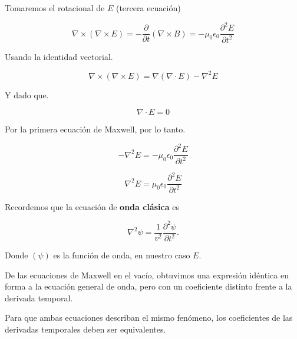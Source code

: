 \documentclass[a4paper,12pt]{article} %
\begin{document}
\begin{justify}
    Tomaremos el rotacional de \(E\) (tercera ecuación) 
\end{justify}

\[ \nabla \times \left( \nabla \times E \right) = - \frac{\partial}{\partial t} \left( \nabla \times B \right) = - \mu_0 \epsilon_0 \frac{\partial^2 E}{\partial t^2}  \]

\begin{justify}
    Usando la identidad vectorial.
\end{justify}

\[ \nabla \times \left( \nabla \times E \right) = \nabla \left( \nabla \cdot E \right) - \nabla^2E \]

\begin{justify}
    Y dado que.
\end{justify}

\[ \nabla \cdot E = 0 \]

\begin{justify}
    Por la primera ecuación de Maxwell, por lo tanto.
\end{justify}

\[  - \nabla^2E = - \mu_0 \epsilon_0 \frac{\partial^2 E}{\partial t^2} \]

\[  \nabla^2E = \mu_0 \epsilon_0 \frac{\partial^2 E}{\partial t^2} \]

\vspace{\baselineskip}

\begin{justify}
    Recordemos que la ecuación de \textbf{onda clásica} es
\end{justify}

\[ \nabla^2 \psi = \frac{1}{v^2} \frac{\partial^2 \psi }{\partial t ^2} .\]

\vspace{\baselineskip}

\begin{justify}
    Donde \((\psi)\) es la función de onda, en nuestro caso \(E.\)
\end{justify}
\begin{justify}
    De las ecuaciones de Maxwell en el vacío, obtuvimos una expresión idéntica en forma a la ecuación general de onda, pero con un coeficiente distinto frente a la derivada temporal.
\end{justify}

\begin{justify}
    Para que ambas ecuaciones describan el mismo fenómeno, los coeficientes de las derivadas temporales deben ser equivalentes.
\end{justify}
\end{document}
